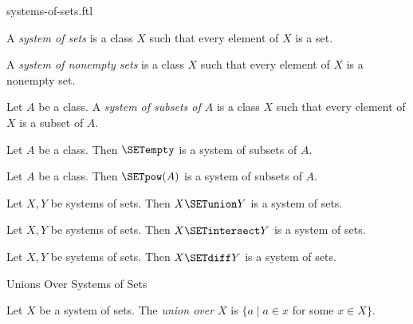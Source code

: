 \documentclass{naproche-library}
\begin{document}
\begin{smodule}[title=Systems of Sets]{systems-of-sets.ftl}

\begin{definition}[forthel,id=FOUNDATIONS_10_5805323570905088]
  A \emph{system of sets} is a class $X$ such that every element of $X$ is a set.
\end{definition}

\begin{definition}[forthel,id=FOUNDATIONS_10_1631952387964928]
  A \emph{system of nonempty sets} is a class $X$ such that every element of $X$ is a nonempty set.
\end{definition}

\begin{definition}[forthel,id=FOUNDATIONS_10_943381479948288]
  Let $A$ be a class.
  A \emph{system of subsets of $A$} is a class $X$ such that every element of $X$ is a subset of $A$.
\end{definition}

\begin{proposition}[forthel,id=FOUNDATIONS_10_8268633648136192]
  Let $A$ be a class.
  Then $\SETempty$ is a system of subsets of $A$.
\end{proposition}

\begin{proposition}[forthel,id=FOUNDATIONS_10_7546016869908480]
  Let $A$ be a class.
  Then $\SETpow(A)$ is a system of subsets of $A$.
\end{proposition}

\begin{proposition}
  Let $X, Y$ be systems of sets.
  Then $X \SETunion Y$ is a system of sets.
\end{proposition}

\begin{proposition}
  Let $X, Y$ be systems of sets.
  Then $X \SETintersect Y$ is a system of sets.
\end{proposition}

\begin{proposition}
  Let $X, Y$ be systems of sets.
  Then $X \SETdiff Y$ is a system of sets.
\end{proposition}

\begin{sfragment}{Unions Over Systems of Sets}
  \begin{definition}[forthel,id=FOUNDATIONS_10_541772562300928]
    Let $X$ be a system of sets.
    The \emph{union over $X$} is $\{ a \mid a \in x$ for some $x \in X \}$.


\end{definition}
\end{sfragment}
\end{smodule}
\end{document}
